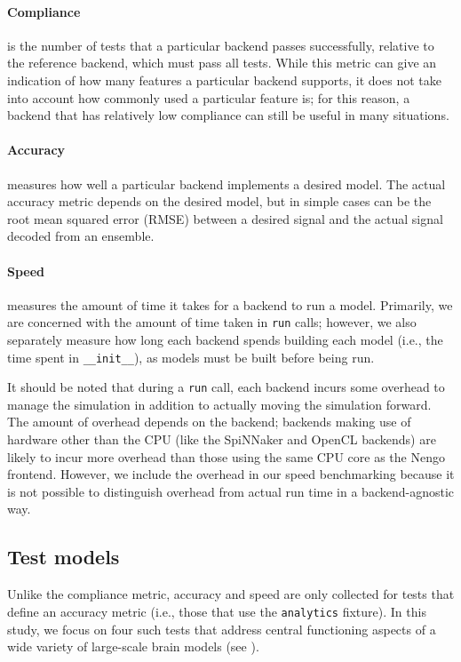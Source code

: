 \documentclass{frontiersSCNS}
\begin{document}
\paragraph{Compliance}
is the number of tests that a particular backend
passes successfully, relative to the reference
backend, which must pass all tests.
While this metric can give an indication
of how many features a particular backend supports,
it does not take into account how commonly used
a particular feature is;
for this reason, a backend that has relatively
low compliance can still be useful
in many situations.

\paragraph{Accuracy}
measures how well a particular backend
implements a desired model.
The actual accuracy metric depends
on the desired model,
but in simple cases can be
the root mean squared error (RMSE)
between a desired signal
and the actual signal decoded
from an ensemble.

\paragraph{Speed}
measures the amount of time it takes
for a backend to run a model.
Primarily, we are concerned with
the amount of time taken
in \texttt{run} calls;
however, we also separately measure how long
each backend spends building each model
(i.e., the time spent in \texttt{\_\_init\_\_}),
as models must be built before being run.

It should be noted that
during a \texttt{run} call,
each backend incurs some overhead
to manage the simulation in addition
to actually moving the simulation forward.
The amount of overhead depends
on the backend; backends making use
of hardware other than the CPU
(like the SpiNNaker and OpenCL backends)
are likely to incur more overhead
than those using the same CPU core
as the Nengo frontend.
However, we include the overhead in
our speed benchmarking because
it is not possible to distinguish
overhead from actual run time
in a backend-agnostic way.

\subsection{Test models}

Unlike the compliance metric,
accuracy and speed are only collected
for tests that define an accuracy metric
(i.e., those that use the \texttt{analytics} fixture).
In this study, we focus on four such tests
that address central functioning aspects
of a wide variety of large-scale brain models
(see \citealp{eliasmith2003a,eliasmith2013}).
\end{document}
